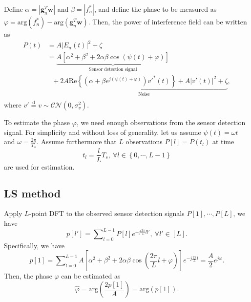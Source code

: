 \documentclass[12pt,draftclsnofoot,journal,onecolumn]{IEEEtran}
\theoremstyle{nonumberplain}
\def \arg {\text{arg}}
\begin{document}
Define $\alpha = \left\vert\bm g_{n}^{T}\bm w\right\vert$ and $\beta = \left\vert f_{n}^{*}\right \vert$, and define the phase to be measured as $\varphi = \arg\left(f_{n}^{*}\right)-\arg\left(\bm g_{n}^{T}\bm w\right)$.
Then, the power of interference field can be written as
\begin{equation}
\label{Power of Interference}
\begin{aligned}
P(t)&=A \left| E_{n} (t)\right |^{2}+\zeta\\
&=\underbrace{A\left[\alpha^{2}+\beta^{2}+2\alpha\beta\cos\left(\psi(t)+\varphi\right)\right]}_{\text{Sensor detection signal}}\\
&~~~+\underbrace{2A\text{Re}\left\{\left(\alpha+\beta e^{j\left(\psi(t)+\varphi\right)}\right)v'^{*}(t)\right\}+A\left|v'(t)\right|^{2}+\zeta}_{\text{Noise}},\\
\end{aligned}
\end{equation}
where $v'\overset{\text{d}}{=}v\sim\mathcal{CN}\left(0,\sigma_{v}^{2}\right)$.

To estimate the phase $\varphi$, we need enough observations from the sensor detection signal. For simplicity and without loss of generality, let us assume $\psi(t)=\omega t$ and $\omega=\frac{2\pi}{T_{s}}$. Assume furthermore that $L$ observations $P[l]=P(t_{l})$ at time 
\begin{equation}
\label{observation time}
t_{l}=\frac{l}{L}T_{s},~\forall l\in \left\{0,\cdots ,L-1\right\}
\end{equation}
are used for estimation.
\subsection{LS method}
Apply $L$-point \ac{DFT} to the observed sensor detection signals $P[1],\cdots ,P[L]$, we have
\begin{equation}
\label{DFT}
p[l']=\sum\nolimits_{l=0}^{L-1}P[l]e^{-j\frac{2\pi}{L}ll'},~\forall l'\in [L].
\end{equation}
Specifically, we have
\begin{equation}
\label{DFT l=1}
p[1]=\sum\nolimits_{l=0}^{L-1}A\left[\alpha^{2}+\beta^{2}+2\alpha\beta\cos\left(\frac{2\pi}{L}l+\varphi\right)\right]e^{-j\frac{2\pi}{L}l}=\frac{A}{2}e^{j\varphi}.
\end{equation}
Then, the phase $\varphi$ can be estimated as
\begin{equation}
\label{LS estimate result}
\hat{\varphi}=\arg\left(\frac{2p[1]}{A}\right) = \arg\left(p[1]\right).
\end{equation}
\end{document}
